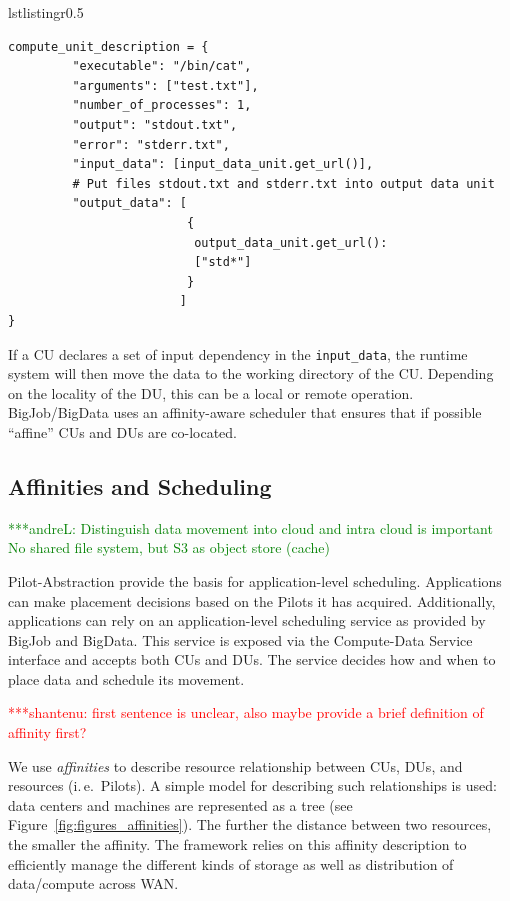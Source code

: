 \documentclass[times]{cpeauth}
\newcommand{\jhanote}[1]{ {\textcolor{red} { ***shantenu: #1 }}}
\newcommand{\alnote}[1]{ {\textcolor{green} { ***andreL: #1 }}}
\newcommand{\alnote}[1]{}
\newcommand{\jhanote}[1]{}
\newcommand{\pilot}{Pilot\xspace}
\newcommand{\pilots}{Pilots\xspace}
\newcommand{\computedataservice}{Compute-Data Service\xspace}
\newcommand{\computeunit}{Compute-Unit\xspace}
\newcommand{\dataunit}{Data-Unit\xspace}
\newcommand{\du}{DU\xspace}
\newcommand{\dus}{DUs\xspace}
\newcommand{\cu}{CU\xspace}
\newcommand{\cus}{CUs\xspace}
\begin{document}
\begin{wrapfloat}{lstlisting}{r}{0.5\textwidth}
\begin{lstlisting}[caption={{Managing \dataunit/\computeunit Dependencies}}, style=myPythonListing, label={lst:cu_du_dependencies} ]
compute_unit_description = {
         "executable": "/bin/cat",
         "arguments": ["test.txt"],
         "number_of_processes": 1,
         "output": "stdout.txt",
         "error": "stderr.txt",   
         "input_data": [input_data_unit.get_url()],
         # Put files stdout.txt and stderr.txt into output data unit
         "output_data": [
                         {
                          output_data_unit.get_url(): 
                          ["std*"]
                         }
                        ]    
}
\end{lstlisting}
\end{wrapfloat}
If a \cu declares a set of input dependency in the \texttt{input\_data}, the 
runtime system will then move the data to the working directory of the \cu. 
Depending on the locality of the \du, this can be a local or remote operation. 
BigJob/BigData uses an affinity-aware scheduler that ensures that if possible 
``affine'' \cus and \dus are co-located.



\subsection{Affinities and Scheduling}
\alnote{
Distinguish data movement into cloud and intra cloud is important
No shared file system, but S3 as object store (cache)
}



\pilot-Abstraction provide the basis for application-level scheduling.
Applications can make placement decisions based on the \pilots it has
acquired. Additionally, applications can rely on an application-level
scheduling service as provided by BigJob and BigData. This service is exposed
via the \computedataservice interface and accepts both \cus and \dus. The
service decides how and when to place data and schedule its movement. 

\jhanote{first sentence is unclear, also maybe provide a brief
  definition of affinity first?} 

We use {\it affinities} to describe resource relationship between \cus, \dus,
and resources (i.\,e.\ \pilots). A simple model for describing such
relationships is used: data centers and machines are represented as a tree
(see Figure~\ref{fig:figures_affinities}). The further the distance between
two resources, the smaller the affinity. The framework relies on this affinity
description to efficiently manage the different kinds of storage as well as
distribution of data/compute across WAN.
\end{document}
